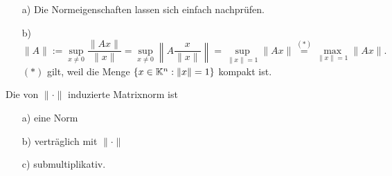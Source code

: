 \begin{Bemerkungen}
\quad
  \begin{enumerate}
    \item[a)] Die Normeigenschaften lassen sich einfach nachprüfen.
    \item[b)] $$\|A\| := \sup_{ x\ne 0} \frac{\| A x \|}{\| x \|} =
    \sup_{ x\ne 0} \left\| A \frac{x}{\| x \|} \right\| =
    \sup_{ \|x \| = 1} \| A x \|
   \overset{(*)}{=} \max_{ \|x \| = 1} \| A x \|.$$
   $(*)$ gilt, weil die Menge $\{x \in \mathbb K^n : \|x \| = 1\}$ kompakt ist.
  \end{enumerate}
\end{Bemerkungen}

\begin{Satz} Die von $\| \cdot \|$  induzierte Matrixnorm ist
  \begin{enumerate}
    \item [a)] eine Norm
    \item [b)] verträglich mit $\| \cdot \|$
    \item [c)] submultiplikativ.
  \end{enumerate}
\end{Satz}

